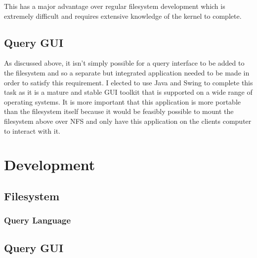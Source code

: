 This has a major advantage over regular filesystem development which is extremely difficult and requires extensive knowledge of the kernel to complete.

\subsection{Query GUI}

As discussed above, it isn't simply possible for a query interface to be added to the filesystem and so a separate but integrated application needed to be made in order to satisfy this requirement. I elected to use Java and Swing to complete this task as it is a mature and stable \ac{GUI} toolkit that is supported on a wide range of operating systems. It is more important that this application is more portable than the filesystem itself because it would be feasibly possible to mount the filesystem above over \ac{NFS} and only have this application on the clients computer to interact with it.

\section{Development}

\subsection{Filesystem}

\subsubsection{Query Language}

\subsection{Query GUI}